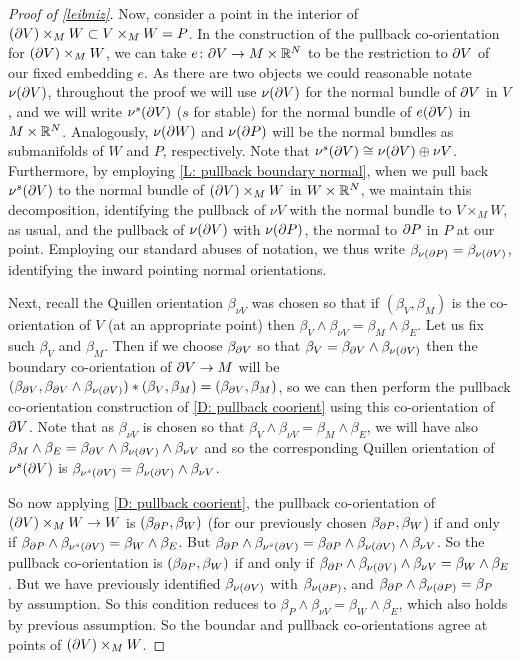 \begin{proof}[Proof of \cref{leibniz}]
	Now, consider a point in the interior of $(\partial V) \times_M W \subset V \times_M W = P$.
	In the construction of the pullback co-orientation for $(\partial V) \times_M W$, we can take $e \colon \partial V \to M \times \mathbb{R}^N$ to be the restriction to $\partial V$ of our fixed embedding $e$.
	As there are two objects we could reasonable notate $\nu (\partial V)$, throughout the proof we will use $\nu (\partial V)$ for the normal bundle of $\partial V$ in $V$, and we will write $\nu^s(\partial V)$ ($s$ for stable) for the normal bundle of $e(\partial V)$ in $M \times \mathbb{R}^N$.
	Analogously, $\nu(\partial W)$ and $\nu(\partial P)$ will be the normal bundles as submanifolds of $W$ and $P$, respectively.
	Note that $\nu^s(\partial V) \cong \nu(\partial V) \oplus \nu V$.
	Furthermore, by employing \cref{L: pullback boundary normal}, when we pull back $\nu^s(\partial V)$ to the normal bundle of $(\partial V) \times_M W$ in $W \times \mathbb{R}^N$, we maintain this decomposition, identifying the pullback of $\nu V$ with the normal bundle to $V \times_M W$, as usual, and the pullback of $\nu(\partial V)$ with $\nu (\partial P)$, the normal to $\partial P$ in $P$ at our point.
	Employing our standard abuses of notation, we thus write $\beta_{\nu(\partial P)} =  \beta_{\nu(\partial V)}$, identifying the inward pointing normal orientations.

	Next, recall the Quillen orientation $\beta_{\nu V}$ was chosen so that if $(\beta_V, \beta_M)$ is the co-orientation of $V$ (at an appropriate point) then $\beta_V \wedge \beta_{\nu V} = \beta_{M} \wedge \beta_E$.
	Let us fix such $\beta_V$ and $\beta_M$.
	Then if we choose $\beta_{\partial V}$ so that $\beta_V = \beta_{\partial V} \wedge \beta_{\nu(\partial V)}$ then the boundary co-orientation of $\partial V \to M$ will be $(\beta_{\partial V}, \beta_{\partial V} \wedge \beta_{\nu(\partial V)}) * (\beta_V, \beta_M) = (\beta_{\partial V},\beta_M)$, so we can then perform the pullback co-orientation construction of \cref{D: pullback coorient} using this co-orientation of $\partial V$.
	Note that as $\beta_{\nu V}$ is chosen so that $\beta_V \wedge \beta_{\nu V} = \beta_M \wedge \beta_E$, we will have also $\beta_M \wedge \beta_E = \beta_{\partial V} \wedge \beta_{\nu(\partial V)} \wedge \beta_{\nu V}$ and so the corresponding Quillen orientation of $\nu^s(\partial V)$ is $\beta_{\nu^s(\partial V)} = \beta_{\nu(\partial V)} \wedge \beta_{\nu V}$.

	So now applying \cref{D: pullback coorient}, the pullback co-orientation of $(\partial V) \times_M W \to W$ is $(\beta_{\partial P},\beta_W)$ (for our previously chosen $\beta_{\partial P}, \beta_W$) if and only if $\beta_{\partial P} \wedge \beta_{\nu^s(\partial V)} = \beta_W \wedge \beta_E$.
	But $\beta_{\partial P} \wedge \beta_{\nu^s(\partial V)} = \beta_{\partial P} \wedge \beta_{\nu(\partial V)} \wedge \beta_{\nu V}$.
	So the pullback co-orientation is $(\beta_{\partial P},\beta_W)$ if and only if $\beta_{\partial P} \wedge \beta_{\nu(\partial V)} \wedge \beta_{\nu V} = \beta_W \wedge \beta_E$.
	But we have previously identified $\beta_{\nu(\partial V)}$ with $\beta_{\nu(\partial P)}$, and $\beta_{\partial P} \wedge \beta_{\nu(\partial P)} = \beta_P$ by assumption.
	So this condition reduces to $\beta_P \wedge \beta_{\nu V} = \beta_W \wedge \beta_E$, which also holds by previous assumption.
	So the boundar and pullback co-orientations agree at points of $(\partial V) \times_M W$.


\end{proof}
